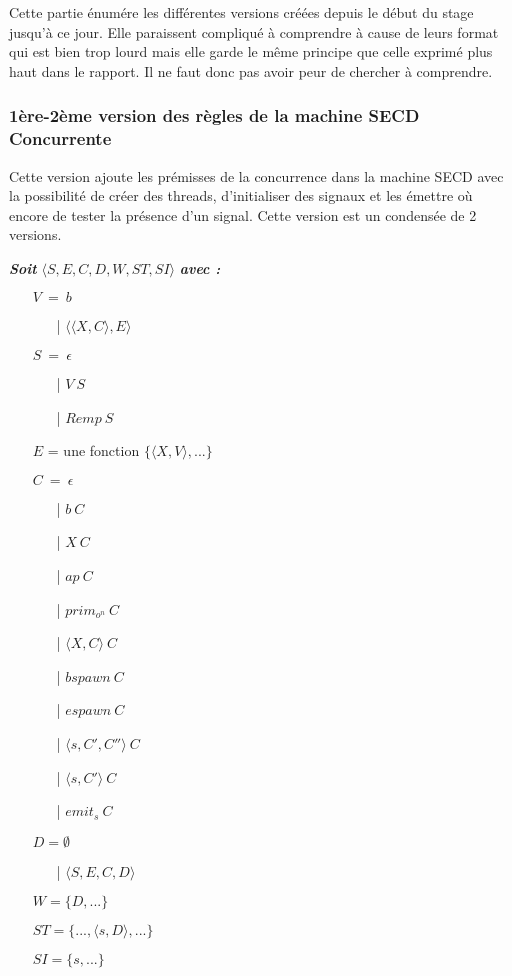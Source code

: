 \documentclass[10pt,a4paper]{report}
\begin{document}
	Cette partie énumére les différentes versions créées depuis le début du stage jusqu'à ce jour. Elle paraissent compliqué à comprendre à cause de leurs format qui est bien trop lourd mais elle garde le même principe que celle exprimé plus haut dans le rapport. Il ne faut donc pas avoir peur de chercher à comprendre.
	
	\subsubsection{1ère-2ème version des règles de la machine SECD Concurrente}\label{SECDConc1-2}
	\smallbreak
	Cette version ajoute les prémisses de la concurrence dans la machine SECD avec la possibilité de créer des threads, d'initialiser des signaux et les émettre où encore de tester la présence d'un signal. Cette version est un condensée de 2 versions.
	\bigbreak
	
	\textbf{\textit{Soit}} $\langle S,E,C,D,W,ST,SI\rangle$ \textbf{\textit{avec :}}
	
	
	\begin{itemize}
		\item[] $V~=~b$
		\begin{itemize}
			\item[|] $\langle\langle X,C\rangle,E\rangle$
		\end{itemize}
		\item[] $S~=~\epsilon$ 
		\begin{itemize}
			\item[|] $V~S$ 
			\item[|] $Remp~S$
		\end{itemize}
		\item[] $E$ = une fonction $\{\langle X,V\rangle,...\}$
		\item[] $C~=~\epsilon$ 
		\begin{itemize}
			\item[|] $b~C$
			\item[|] $X~C$
			\item[|] $ap~C$
			\item[|] $prim_{o^{n}}~C$  
			\item[|] $\langle X,C\rangle~C$
			\item[|] $bspawn~C$ 
			\item[|] $espawn~C$
			\item[|] $\langle s,C',C''\rangle~C$
			\item[|] $\langle s,C'\rangle~C$ 
			\item[|] $emit_{s}~C$ 
		\end{itemize}
		\item[] $D = \emptyset$
		\begin{itemize}
			\item[|] $\langle S,E,C,D\rangle$ 
		\end{itemize}
		\item[] $W = \{D,...\}$
		\item[] $ST = \{...,\langle s,D\rangle,...\}$
		\item[] $SI = \{ s,...\}$
	\end{itemize}
	\bigbreak
	\bigbreak
	
\end{document}

